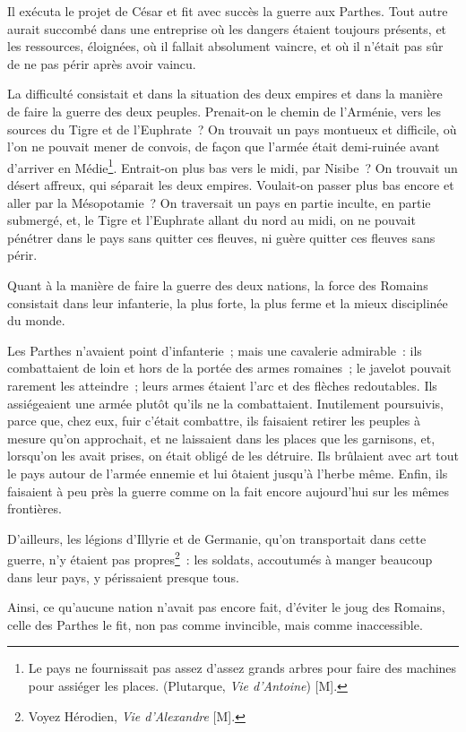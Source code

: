 \documentclass[french,twoside]{book} %
\begin{document}
Il exécuta le projet de César et fit avec succès la guerre aux Parthes. Tout autre aurait succombé dans une entreprise où les dangers étaient toujours présents, et les ressources, éloignées, où il fallait absolument vaincre, et où il n’était pas sûr de ne pas périr après avoir vaincu.\par
La difficulté consistait et dans la situation des deux empires et dans la manière de faire la guerre des deux peuples. Prenait-on le chemin de l’Arménie, vers les sources du Tigre et de l’Euphrate ? On trouvait un pays montueux et difficile, où l’on ne pouvait mener de convois, de façon que l’armée était demi-ruinée avant d’arriver en Médie\footnote{Le pays ne fournissait pas assez d’assez grands arbres pour faire des machines pour assiéger les places. (Plutarque, {\itshape Vie d’Antoine}) [M].}. Entrait-on plus bas vers le midi, par Nisibe ? On trouvait un désert affreux, qui séparait les deux empires. Voulait-on passer plus bas encore et aller par la Mésopotamie ? On traversait un pays en partie inculte, en partie submergé, et, le Tigre et l’Euphrate allant du nord au midi, on ne pouvait pénétrer dans le pays sans quitter ces fleuves, ni guère quitter ces fleuves sans périr.\par
Quant à la manière de faire la guerre des deux nations, la force des Romains consistait dans leur infanterie, la plus forte, la plus ferme et la mieux disciplinée du monde.\par
Les Parthes n’avaient point d’infanterie ; mais une cavalerie admirable : ils combattaient de loin et hors de la portée des armes romaines ; le javelot pouvait rarement les atteindre ; leurs armes étaient l’arc et des flèches redoutables. Ils assiégeaient une armée plutôt qu’ils ne la combattaient. Inutilement poursuivis, parce que, chez eux, fuir c’était combattre, ils faisaient retirer les peuples à mesure qu’on approchait, et ne laissaient dans les places que les garnisons, et, lorsqu’on les avait prises, on était obligé de les détruire. Ils brûlaient avec art tout le pays autour de l’armée ennemie et lui ôtaient jusqu’à l’herbe même. Enfin, ils faisaient à peu près la guerre comme on la fait encore aujourd’hui sur les mêmes frontières.\par
D’ailleurs, les légions d’Illyrie et de Germanie, qu’on transportait dans cette guerre, n’y étaient pas propres\footnote{Voyez Hérodien, {\itshape Vie d’Alexandre} [M].} : les soldats, accoutumés à manger beaucoup dans leur pays, y périssaient presque tous.\par
Ainsi, ce qu’aucune nation n’avait pas encore fait, d’éviter le joug des Romains, celle des Parthes le fit, non pas comme invincible, mais comme inaccessible.\par
\end{document}
